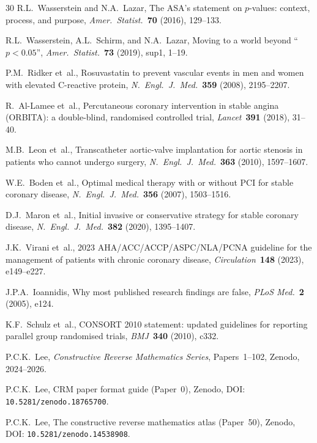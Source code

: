 \documentclass[11pt,a4paper]{article}
\theoremstyle{plain}
\theoremstyle{definition}
\begin{document}
\begin{thebibliography}{30}
R.L.~Wasserstein and N.A.~Lazar, The ASA's statement on $p$-values: context, process, and purpose, \emph{Amer.\ Statist.}\ \textbf{70} (2016), 129--133.

R.L.~Wasserstein, A.L.~Schirm, and N.A.~Lazar, Moving to a world beyond ``$p < 0.05$'', \emph{Amer.\ Statist.}\ \textbf{73} (2019), sup1, 1--19.

P.M.~Ridker et~al., Rosuvastatin to prevent vascular events in men and women with elevated C-reactive protein, \emph{N.\ Engl.\ J.\ Med.}\ \textbf{359} (2008), 2195--2207.

R.~Al-Lamee et~al., Percutaneous coronary intervention in stable angina (ORBITA): a double-blind, randomised controlled trial, \emph{Lancet}\ \textbf{391} (2018), 31--40.

M.B.~Leon et~al., Transcatheter aortic-valve implantation for aortic stenosis in patients who cannot undergo surgery, \emph{N.\ Engl.\ J.\ Med.}\ \textbf{363} (2010), 1597--1607.

W.E.~Boden et~al., Optimal medical therapy with or without PCI for stable coronary disease, \emph{N.\ Engl.\ J.\ Med.}\ \textbf{356} (2007), 1503--1516.

D.J.~Maron et~al., Initial invasive or conservative strategy for stable coronary disease, \emph{N.\ Engl.\ J.\ Med.}\ \textbf{382} (2020), 1395--1407.

J.K.~Virani et~al., 2023 AHA/ACC/ACCP/ASPC/NLA/PCNA guideline for the management of patients with chronic coronary disease, \emph{Circulation}\ \textbf{148} (2023), e149--e227.

J.P.A.~Ioannidis, Why most published research findings are false, \emph{PLoS Med.}\ \textbf{2} (2005), e124.

K.F.~Schulz et~al., CONSORT 2010 statement: updated guidelines for reporting parallel group randomised trials, \emph{BMJ}\ \textbf{340} (2010), c332.

P.C.K.~Lee, \emph{Constructive Reverse Mathematics Series}, Papers~1--102, Zenodo, 2024--2026.

P.C.K.~Lee, CRM paper format guide (Paper~0), Zenodo, DOI: \texttt{10.5281/zenodo.18765700}.

P.C.K.~Lee, The constructive reverse mathematics atlas (Paper~50), Zenodo, DOI: \texttt{10.5281/zenodo.14538908}.


\end{thebibliography}
\end{document}
